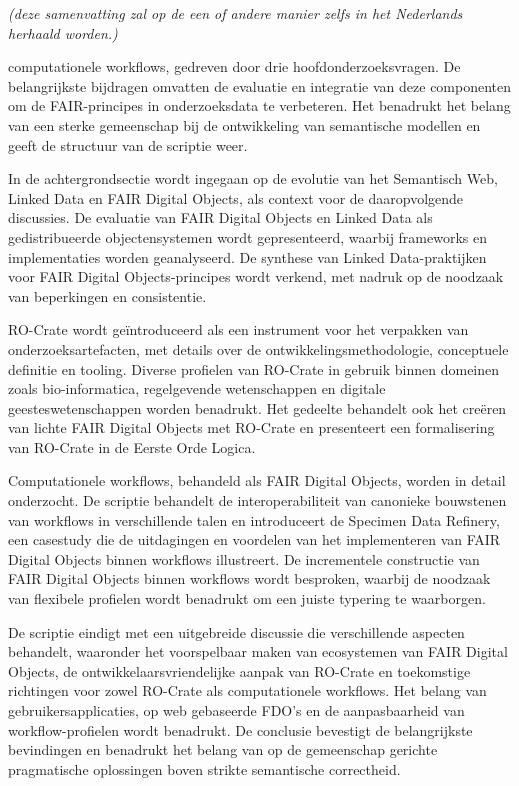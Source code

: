 \emph{(deze samenvatting zal op de een of andere manier zelfs in
het Nederlands herhaald
worden.)}


computationele workflows, gedreven door drie hoofdonderzoeksvragen. De belangrijkste bijdragen omvatten de evaluatie en integratie van deze componenten om de FAIR-principes in onderzoeksdata te verbeteren. Het benadrukt het belang van een sterke gemeenschap bij de ontwikkeling van semantische modellen en geeft de structuur van de scriptie weer.

In de achtergrondsectie wordt ingegaan op de evolutie van het Semantisch Web, Linked Data en FAIR Digital Objects, als context voor de daaropvolgende discussies. De evaluatie van FAIR Digital Objects en Linked Data als gedistribueerde objectensystemen wordt gepresenteerd, waarbij frameworks en implementaties worden geanalyseerd. De synthese van Linked Data-praktijken voor FAIR Digital Objects-principes wordt verkend, met nadruk op de noodzaak van beperkingen en consistentie.

RO-Crate wordt geïntroduceerd als een instrument voor het verpakken van onderzoeksartefacten, met details over de ontwikkelingsmethodologie, conceptuele definitie en tooling. Diverse profielen van RO-Crate in gebruik binnen domeinen zoals bio-informatica, regelgevende wetenschappen en digitale geesteswetenschappen worden benadrukt. Het gedeelte behandelt ook het creëren van lichte FAIR Digital Objects met RO-Crate en presenteert een formalisering van RO-Crate in de Eerste Orde Logica.

Computationele workflows, behandeld als FAIR Digital Objects, worden in detail onderzocht. De scriptie behandelt de interoperabiliteit van canonieke bouwstenen van workflows in verschillende talen en introduceert de Specimen Data Refinery, een casestudy die de uitdagingen en voordelen van het implementeren van FAIR Digital Objects binnen workflows illustreert. De incrementele constructie van FAIR Digital Objects binnen workflows wordt besproken, waarbij de noodzaak van flexibele profielen wordt benadrukt om een juiste typering te waarborgen.

De scriptie eindigt met een uitgebreide discussie die verschillende aspecten behandelt, waaronder het voorspelbaar maken van ecosystemen van FAIR Digital Objects, de ontwikkelaarsvriendelijke aanpak van RO-Crate en toekomstige richtingen voor zowel RO-Crate als computationele workflows. Het belang van gebruikersapplicaties, op web gebaseerde FDO's en de aanpasbaarheid van workflow-profielen wordt benadrukt. De conclusie bevestigt de belangrijkste bevindingen en benadrukt het belang van op de gemeenschap gerichte pragmatische oplossingen boven strikte semantische correctheid.